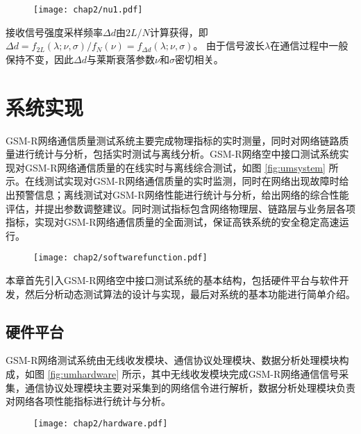 \begin{figure}[!htp]
\centerline{
\texttt{[image: chap2/nu1.pdf]}
}
\end{figure}

接收信号强度采样频率$\Delta d$由$2L/N$计算获得，即$\Delta d=f_{2L}(\lambda;\nu,\sigma)/f_{N}(\nu)=f_{\Delta d}(\lambda;\nu,\sigma)$。 由于信号波长$\lambda$在通信过程中一般保持不变，因此$\Delta d$与莱斯衰落参数$\nu$和$\sigma$密切相关。

\section{系统实现}
\label{sec:system_phy}

GSM-R网络通信质量测试系统主要完成物理指标的实时测量，同时对网络链路质量进行统计与分析，包括实时测试与离线分析。GSM-R网络空中接口测试系统实现对GSM-R网络通信质量的在线实时与离线综合测试，如图 \ref{fig:umsystem} 所示。在线测试实现对GSM-R网络通信质量的实时监测，同时在网络出现故障时给出预警信息；离线测试对GSM-R网络性能进行统计与分析，给出网络的综合性能评估，并提出参数调整建议。同时测试指标包含网络物理层、链路层与业务层各项指标，实现对GSM-R网络通信质量的全面测试，保证高铁系统的安全稳定高速运行。

\begin{figure}[!htp]
\centering
    \texttt{[image: chap2/softwarefunction.pdf]}
\end{figure}

本章首先引入GSM-R网络空中接口测试系统的基本结构，包括硬件平台与软件开发，然后分析动态测试算法的设计与实现，最后对系统的基本功能进行简单介绍。

\subsection{硬件平台}
\label{sec:um}

GSM-R网络测试系统由无线收发模块、通信协议处理模块、数据分析处理模块构成，如图 \ref{fig:umhardware} 所示，其中无线收发模块完成GSM-R网络通信信号采集，通信协议处理模块主要对采集到的网络信令进行解析，数据分析处理模块负责对网络各项性能指标进行统计与分析。

\begin{figure}[!htp]
\centering
    \texttt{[image: chap2/hardware.pdf]}
\end{figure}

